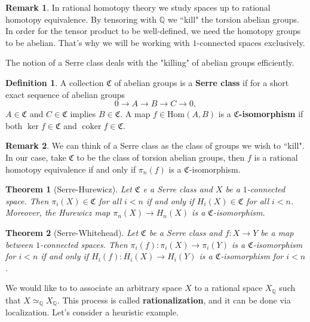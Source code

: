 \documentclass[psamsfonts]{amsart}
\newtheorem{thm}{Theorem}[section]
\theoremstyle{definition}
\newtheorem{defn}{Definition}[section]
\newtheorem{rem}{Remark}[section]
\newcommand{\Q}{\mathbb{Q}}
\newcommand{\Hom}{\mathrm{Hom}}
\DeclareMathOperator{\coker}{coker}
\numberwithin{equation}{section}
\begin{document}
\begin{rem}
In rational homotopy theory we study spaces up to rational homotopy equivalence. By tensoring with $\Q$ we ``kill" the torsion abelian groups. In order for the tensor product to be well-defined, we need the homotopy groups to be abelian. That's why we will be working with $1$-connected spaces exclusively. 
\end{rem}

The notion of a Serre class deals with the "killing" of abelian groups efficiently.

\begin{defn}
A collection $\mathfrak{C}$ of abelian groups is a \textbf{Serre class} if for a short exact sequence of abelian groups
\[0\rightarrow A\to B\to C\to0,\]
$A\in\mathfrak{C}$ and $C\in\mathfrak{C}$ implies $B\in\mathfrak{C}$. A map $f\in\Hom(A,B)$ is a \textbf{$\mathfrak{C}$-isomorphism} if both $\ker f\in\mathfrak{C}$ and $\coker f\in\mathfrak{C}$.
\end{defn}

\begin{rem}
We can think of a Serre class as the class of groups we wish to ``kill". In our case, take $\mathfrak{C}$ to be the class of torsion abelian groups, then $f$ is a rational homotopy equivalence if and only if $\pi_n(f)$ is a $\mathfrak{C}$-isomorphism.
\end{rem}

\begin{thm}[Serre-Hurewicz]
Let $\mathfrak{C}$ e a Serre class and $X$ be a $1$-connected space. Then $\pi_i(X)\in\mathfrak{C}$ for all $i<n$ if and only if $H_i(X)\in\mathfrak{C}$ for all $i<n$. Moreover, the Hurewicz map $\pi_n(X)\to H_n(X)$ is a $\mathfrak{C}$-isomorphism.
\end{thm}

\begin{thm}[Serre-Whitehead]
Let $\mathfrak{C}$ be a Serre class and $f:X\to Y$ be a map between $1$-connected spaces. Then $\pi_i(f):\pi_i(X)\to\pi_i(Y)$ is a $\mathfrak{C}$-isomorphism for $i<n$ if and only if $H_i(f):H_i(X)\to H_i(Y)$ is a $\mathfrak{C}$-isomorphism for $i<n$.
\end{thm}

We would like to to associate an arbitrary space $X$ to a rational space $X_\Q$ such that $X\simeq_\Q X_\Q$. This process is called \textbf{rationalization}, and it can be done via localization. Let's consider a heuristic example.
\end{document}
